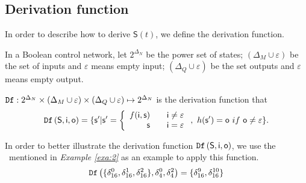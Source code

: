 

\subsection{Derivation function}
In order to describe how to derive $\mathsf{S}(t)$, we define the derivation function. %
\begin{definition} 
In a Boolean control network, let
$2^{\Delta_N}$ be the power set of states; 
$(\Delta_M\cup\varepsilon)$ be the set of inputs and $\varepsilon$ means empty input; 
$(\Delta_Q\cup\varepsilon)$ be the set outputs and $\varepsilon$ means empty output.

${\tt Df}:2^{\Delta_N}\times (\Delta_M\cup\varepsilon) \times (\Delta_Q\cup\varepsilon) \mapsto 2^{\Delta_N}$
is the derivation function that
\[{\tt Df}\left( \mathsf{S},  \mathsf{i},  \mathsf{o}\right)
=\{ \mathsf{s}'| \mathsf{s}'=\left\{
\begin{array}{rcl}
f( \mathsf{i}, \mathsf{s})      &      & {\mathsf{i}\neq \varepsilon}\\
\mathsf{s}       &      & {\mathsf{i}= \varepsilon}
\end{array} \right. ,\ h(\mathsf{s}')=\mathsf{o}\ if\ \mathsf{o}\neq \varepsilon\}.\]
\end{definition}

\begin{example}
 In order to better illustrate the derivation function ${\tt Df}\left( \mathsf{S},  \mathsf{i},  \mathsf{o}\right)$, we use the \BCN\ mentioned in {\em Example \ref{exa:2}} as an example to apply this function. \[{\tt Df}\left(\{\delta_{16}^0,\delta_{16}^1,\delta_{16}^2\},\delta_4^0,\delta_4^2\right)=\{\delta_{16}^{9},\delta_{16}^{10}\}\]
 \label{exa:8}
 \end{example}   
 
